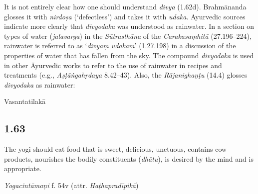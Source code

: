 \begin{ekdosis}
\begin{philcomm}[hp01_062]
It is not entirely clear how one should understand \emph{divya} (1.62d). Brahmānanda glosses it with \emph{nirdoṣa} (`defectless') and takes it with \emph{udaka}. Ayurvedic sources indicate more clearly that \emph{divyodaka} was understood as rainwater. In a section on types of water (\emph{jalavarga}) in the \emph{Sūtrasthāna} of the \emph{Carakasaṃhitā} (27.196–224), rainwater is referred to as `\emph{divyaṃ udakam}' (1.27.198) in a discussion of the properties of water that has fallen from the sky. The compound \emph{divyodaka} is used in other Āyurvedic works to refer to the use of rainwater in recipes and treatments  (e.g., \emph{Aṣṭāṅgahṛdaya} 8.42–43). Also, the \emph{Rājanighaṇṭu} (14.4) glosses \emph{divyodaka} as rainwater:
\begin{quote}
\begin{versinnote}
\end{versinnote}
\end{quote}
%
%
\end{philcomm}

\begin{metre}[hp01_062]
Vasantatilakā 
\end{metre}

\subsection*{1.63}
\begin{translation}[hp01_063]
The yogi should eat food that is sweet, delicious, unctuous, contains cow products, nourishes the bodily constituents (\emph{dhātu}), is desired by the mind and is appropriate.
\end{translation}


\begin{testimonia}[hp01_063]

\emph{Yogacintāmaṇi} f. 54v (attr. \emph{Haṭhapradīpikā})

\begin{versinnote}
\end{versinnote}


\end{testimonia}
\end{ekdosis}
